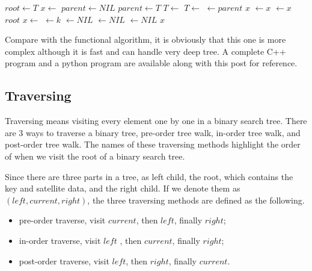 \documentclass{article}
\begin{document}
\begin{algorithmic}[1]
  \State $root \gets T$
  \State $x \gets$ 
  \State $parent \gets NIL$
    \State $parent \gets T$
      \State $T \gets $ 
    \Else
      \State $T \gets $ 
    \EndIf
  \EndWhile
  \State {} $\gets parent$
   
    \State \Return $x$
    \State {} $\gets x$
  \Else
    \State {} $\gets x$
  \EndIf
  \State \Return $root$
\EndFunction
\Statex
{}
  \State $x \gets $ 
  \State {} $ \gets k$
  \State {} $ \gets NIL$
  \State {} $ \gets NIL$
  \State {} $ \gets NIL$
  \State \Return $x$
\EndFunction
\end{algorithmic}

Compare with the functional algorithm, it is obviously that this one
is more complex although it is fast and can handle very deep tree. A 
complete C++ program and a python program are available along with this
post for reference.

\subsection{Traversing}

Traversing means visiting every element one by one in a binary 
search tree. There are 3 ways to traverse a binary tree, pre-order tree walk, 
in-order tree walk, and post-order tree walk. The names of these
traversing methods highlight the order of when we visit the root
of a binary search tree.

Since there are three parts in a tree, as left child, the root, which
contains the key and satellite data, and the right child. If we denote
them as $(left, current, right)$, the three traversing methods are defined 
as the following.

\begin{itemize}
\item pre-order traverse, visit $current$, then $left$, finally $right$;
\item in-order traverse, visit $left$ , then $current$, finally $right$;
\item post-order traverse, visit $left$, then $right$, finally $current$.
\end{itemize}
\end{document}
